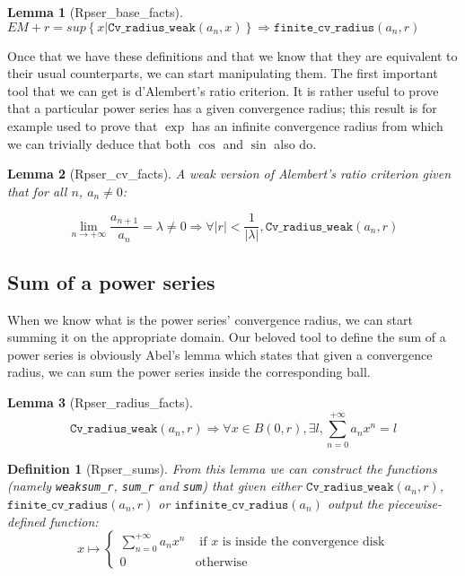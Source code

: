 \documentclass[submission,copyright]{eptcs}
\newcommand{\cvrw}{\texttt{Cv\_radius\_weak}}
\newcommand{\fcvr}{\texttt{finite\_cv\_radius}}
\newcommand{\icvr}{\texttt{infinite\_cv\_radius}}
\newtheorem{definition}{Definition}
\newtheorem{lemma}{Lemma}
\begin{document}
\begin{lemma}[Rpser\_base\_facts] $EM + r = sup \left\lbrace x |
\cvrw{}(a_n, x) \right\rbrace \Rightarrow \fcvr{}(a_n,r)$ \end{lemma}

Once that we have these definitions and that we know that they are
equivalent to their usual counterparts, we can start manipulating them.
The first important tool that we can get is d'Alembert's ratio criterion.
It is rather useful to prove that a particular power series has a given
convergence radius; this result is for example used to prove that $\exp$
has an infinite convergence radius from which we can trivially deduce
that both $\cos$ and $\sin$ also do.

\begin{lemma}[Rpser\_cv\_facts] A weak version of Alembert's ratio
criterion given that for all $n$, $a_n \neq 0$:

$$\lim\limits_{n \to + \infty}\frac{a_{n+1}}{a_n} = \lambda \neq 0
  \Rightarrow \forall \left| r \right| < \frac{1}{\left| \lambda \right|
  }, \cvrw{}(a_n,r)$$
\end{lemma}

\subsection{Sum of a power series}

When we know what is the power series' convergence radius, we can start
summing it on the appropriate domain. Our beloved tool to define the sum
of a power series is obviously Abel's lemma which states that given a
convergence radius, we can sum the power series inside the corresponding
ball.

\begin{lemma}[Rpser\_radius\_facts] $$\cvrw{}(a_n,r) \Rightarrow
\forall x \in B(0,r), \exists l, \sum_{n=0}^{+\infty} a_n x^n = l$$
\end{lemma}

\begin{definition}[Rpser\_sums] From this lemma we can construct the functions
(namely \texttt{weaksum\_r}, \texttt{sum\_r} and \texttt{sum}) that given either
$\cvrw{}(a_n,r)$, $\fcvr{}(a_n,r)$ or $\icvr{}(a_n)$ output the piecewise-defined
function: $$x \mapsto \left\lbrace
\begin{array}{ll}
\sum_{n=0}^{+\infty} a_n x^n & \text{ if } x \text{ is inside the convergence
disk}\\
0 & \text{otherwise}
\end{array}\right.$$
\end{definition}
\end{document}
